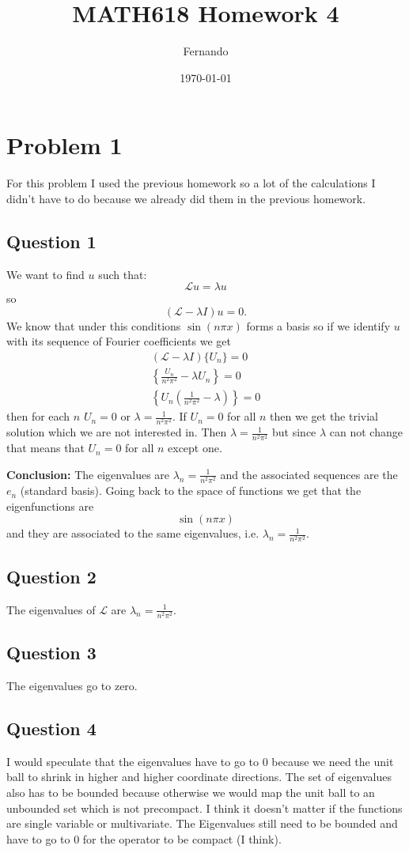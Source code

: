 \documentclass[12pt]{article}%
\begin{document}
\title{MATH618 Homework 4}
\author{Fernando}
\date{\today}
\maketitle
\section*{Problem 1}
For this problem I used the previous homework so a lot of the calculations I
didn't have to do because we already did them in the previous homework.
\subsection*{Question 1}
We want to find $u$ such that:
\[
	\mathcal{L}u=\lambda u
\]
so
\[
	(\mathcal{L}-\lambda I) u=0.
\]
We know that under this conditions $\sin(n\pi x)$ forms a basis so if we
identify $u$ with its sequence of Fourier coefficients we get
\begin{align*}
	(\mathcal{L}-\lambda I)\{U_n\}=0\\
	\left\{\frac{U_n}{n^2\pi^2}-\lambda U_n\right\}=0\\
	\left\{U_n\left(\frac{1}{n^2\pi^2}-\lambda\right)\right\}=0
\end{align*}
then for each $n$ $U_n=0$ or $\lambda=\frac{1}{n^2\pi^2}$. If $U_n=0$ for all
$n$ then we get the trivial solution which we are not interested in. Then
$\lambda = \frac{1}{n^2 \pi^2}$ but since $\lambda$ can not change that means
that $U_n=0$ for all $n$ except one.

\textbf{Conclusion:} The eigenvalues are $\lambda_n=\frac{1}{n^2\pi^2}$ and the
associated sequences are the $e_n$ (standard basis). Going back to the space of
functions we get that the eigenfunctions are
\[
	\sin(n\pi x)
\]
and they are associated to the same eigenvalues, i.e.
$\lambda_n=\frac{1}{n^2\pi^2}$.
\subsection*{Question 2}
The eigenvalues of $\mathcal{L}$ are $\lambda_n=\frac{1}{n^2\pi^2}$.
\subsection*{Question 3}
The eigenvalues go to zero.
\subsection*{Question 4}
I would speculate that the eigenvalues have to go to 0 because we need the unit
ball to shrink in higher and higher coordinate directions. The set of
eigenvalues also has to be bounded because otherwise we would map the unit ball
to an unbounded set which is not precompact. I think it doesn't matter if the
functions are single variable or multivariate. The Eigenvalues still need to be
bounded and have to go to 0 for the operator to be compact (I think).
\end{document}
